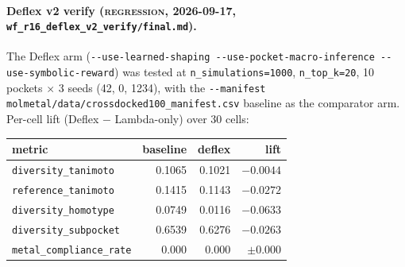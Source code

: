 {\paragraph{Deflex v2 verify (\textsc{regression}, 2026-09-17,
\texttt{wf\_r16\_deflex\_v2\_verify/final.md}).}
The Deflex arm (\texttt{-{}-use-learned-shaping
-{}-use-pocket-macro-inference -{}-use-symbolic-reward}) was
tested at \texttt{n\_simulations=1000}, \texttt{n\_top\_k=20},
10 pockets $\times$ 3 seeds (42, 0, 1234), with the
\texttt{-{}-manifest molmetal/data/crossdocked100\_manifest.csv}
baseline as the comparator arm. Per-cell lift (Deflex $-$
Lambda-only) over 30 cells:

\begin{center}
\begin{tabular}{lrrr}
\toprule
\textbf{metric} & \textbf{baseline} & \textbf{deflex} & \textbf{lift}\\
\midrule
\texttt{diversity\_tanimoto}    & 0.1065 & 0.1021 & $-0.0044$\\
\texttt{reference\_tanimoto}   & 0.1415 & 0.1143 & $-0.0272$\\
\texttt{diversity\_homotype}   & 0.0749 & 0.0116 & $-0.0633$\\
\texttt{diversity\_subpocket}  & 0.6539 & 0.6276 & $-0.0263$\\
\texttt{metal\_compliance\_rate}& 0.000  & 0.000  & $\pm 0.000$\\
\bottomrule
\end{tabular}
\end{center}

}
